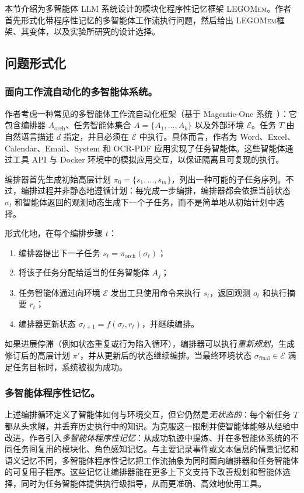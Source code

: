 \documentclass[10pt,twocolumn]{article}
\newcommand{\legomem}{\textsc{LEGOMem}}
\begin{document}
本节介绍为多智能体 LLM 系统设计的模块化程序性记忆框架 \legomem。作者首先形式化带程序性记忆的多智能体工作流执行问题，然后给出 \legomem 框架、其变体，以及实验所研究的设计选择。

\subsection{问题形式化}

\subsubsection{面向工作流自动化的多智能体系统。}
作者考虑一种常见的多智能体工作流自动化框架（基于 Magentic-One 系统~\cite{fourney2024magentic}）：它包含编排器 $A_{\text{orch}}$、任务智能体集合 $A=\{A_1,\ldots,A_k\}$ 以及外部环境 $\mathcal{E}$。任务 $T$ 由自然语言描述 $d$ 指定，并且必须在 $\mathcal{E}$ 中执行。具体而言，作者为 Word、Excel、Calendar、Email、System 和 OCR-PDF 应用实现了任务智能体。这些智能体通过工具 API 与 Docker 环境中的模拟应用交互，以保证隔离且可复现的执行。

编排器首先生成初始高层计划 $\pi_0=\{s_1,\ldots,s_m\}$，列出一种可能的子任务序列。不过，编排过程并非静态地遵循计划：每完成一步编排，编排器都会依据当前状态 $\sigma_t$ 和智能体返回的观测动态生成下一个子任务，而不是简单地从初始计划中选择。

形式化地，在每个编排步骤 $t$：
\begin{enumerate}
    \item 编排器提出下一子任务 $s_t=\pi_{\text{orch}}(\sigma_t)$；
    \item 将该子任务分配给适当的任务智能体 $A_j$；
    \item 任务智能体通过向环境 $\mathcal{E}$ 发出工具使用命令来执行 $s_t$，返回观测 $o_t$ 和执行摘要 $r_t$；
    \item 编排器更新状态 $\sigma_{t+1}=f(\sigma_t,r_t)$，并继续编排。
\end{enumerate}
如果进展停滞（例如状态重复或行为陷入循环），编排器可以执行\emph{重新规划}，生成修订后的高层计划 $\pi'$，并从更新后的状态继续编排。当最终环境状态 $\sigma_{\text{final}}\in\mathcal{E}$ 满足任务目标时，系统被视为成功。

\subsubsection{多智能体程序性记忆。}
上述编排循环定义了智能体如何与环境交互，但它仍然是\emph{无状态的}：每个新任务 $T$ 都从头求解，并丢弃历史执行中的知识。为克服这一限制并使智能体能够从经验中改进，作者引入\emph{多智能体程序性记忆}：从成功轨迹中提炼、并在多智能体系统的不同任务间复用的模块化、角色感知记忆。与主要记录事件或文本信息的情景记忆和语义记忆不同，多智能体程序性记忆把工作流抽象为同时面向编排器和任务智能体的可复用子程序。这些记忆让编排器能在更多上下文支持下改善规划和智能体选择，同时为任务智能体提供执行级指导，从而更准确、高效地使用工具。
\end{document}
